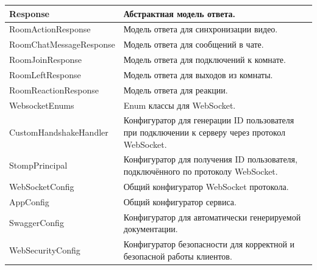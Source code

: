 \documentclass{../includes/TechDoc}
\begin{document}
\begin{table}[h]
\begin{tabularx}{\textwidth}{|l|X|}
            \hline
            Response                    & Абстрактная модель ответа.                                              \\
            \hline
            RoomActionResponse          & Модель ответа для синхронизации видео.                                  \\
            \hline
            RoomChatMessageResponse     & Модель ответа для сообщений в чате.                                     \\
            \hline
            RoomJoinResponse            & Модель ответа для подключений к комнате.                                \\
            \hline
            RoomLeftResponse            & Модель ответа для выходов из комнаты.                                   \\
            \hline
            RoomReactionResponse        & Модель ответа для реакции.                                              \\
            \hline
            WebsocketEnums              & Enum классы для WebSocket.                                              \\
            \hline
            CustomHandshakeHandler              & Конфигуратор для генерации ID пользователя при подключении к серверу через протокол WebSocket.                                              \\
            \hline
            StompPrincipal              & Конфигуратор для получения ID пользователя, подключённого по протоколу WebSocket.                                              \\
            \hline
            WebSocketConfig              & Общий конфигуратор WebSocket протокола.                                              \\
            \hline
            AppConfig              & Общий конфигуратор сервиса.                                              \\
            \hline
            SwaggerConfig              & Конфигуратор для автоматически генерируемой документации.                                              \\
            \hline
            WebSecurityConfig              & Конфигуратор безопасности для корректной и безопасной работы клиентов.                                              \\
            \hline
        \end{tabularx}
    \end{table}
\end{document}

